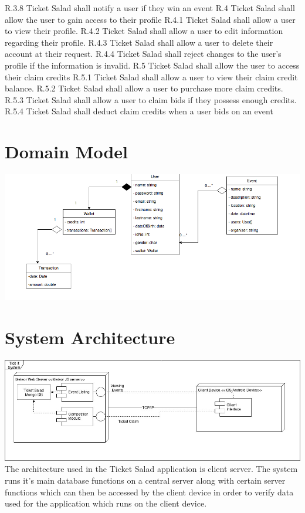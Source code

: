 \documentclass[11pt]{article}
\begin{document}
	\newline R.3.8 Ticket Salad shall notify a user if they win an event \newline\newline
	R.4 Ticket Salad shall allow the user to gain access to their profile
	\newline R.4.1 Ticket Salad shall allow a user to view their profile.
	\newline R.4.2 Ticket Salad shall allow a user to edit information regarding their profile.
	\newline R.4.3 Ticket Salad shall allow a user to delete their account at their request.
	\newline R.4.4 Ticket Salad shall reject changes to the user’s profile if the information is invalid.\newline\newline
	R.5 Ticket Salad shall allow the user to access their claim credits
	\newline R.5.1 Ticket Salad shall allow a user to view their claim credit balance.
	\newline R.5.2 Ticket Salad shall allow a user to purchase more claim credits.
	\newline R.5.3 Ticket Salad shall allow a user to claim bids if they possess enough credits.
	\newline R.5.4 Ticket Salad shall deduct claim credits when a user bids on an event
	\newline
	\section{Domain Model}
	\includegraphics[scale=0.4]{Domain}
	\section{System Architecture}
	\includegraphics[scale=0.4]{Architecture}
	\newline
	The architecture used in the Ticket Salad application is client server. The system runs it's main database functions on a central server along with certain server functions which can then be accessed by the client device in order to verify data used for the application which runs on the client device.
	
	
	
	
\end{document}
